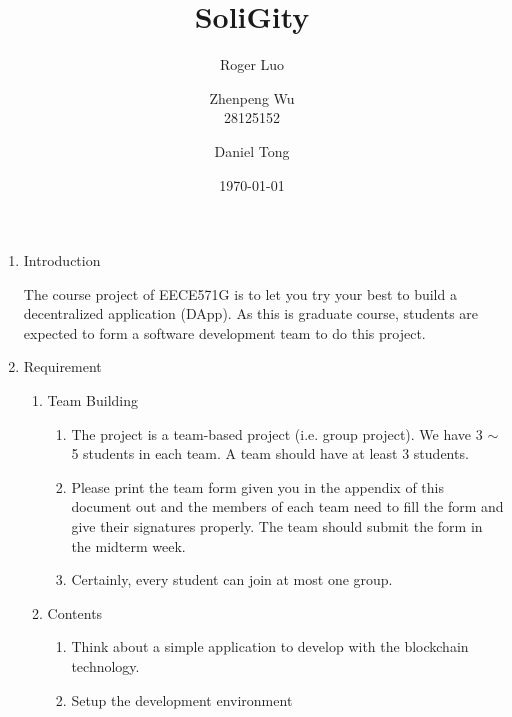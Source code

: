 \documentclass[12pt]{article}
\title{SoliGity}
\author{  Roger Luo
  \and
  Zhenpeng Wu\\
  28125152 
  \and
  Daniel Tong
}
\date{\today}
\renewcommand{\_}{\kern-1.5pt\textunderscore\kern-1.5pt}
\begin{document}
\maketitle



\vspace{\baselineskip}
\begin{enumerate}
	\item Introduction\par

The course project of EECE571G is to let you try your best to build a decentralized application (DApp). As this is graduate course, students are expected to form a software development team to do this project. \par

	\item Requirement\par

\begin{enumerate}
	\item Team Building\par

\begin{enumerate}
	\item The project is a team-based project (i.e. group project). We have 3 $ \sim $  5 students in each team. A team should have at least 3 students. \par

	\item Please print the team form given you in the appendix of this document out and the members of each team need to fill the form and give their signatures properly. The team should submit the form in the midterm week.\par

	\item Certainly, every student can join at most one group. \par


\end{enumerate}
	\item Contents\par

\begin{enumerate}
	\item Think about a simple application to develop with the blockchain technology.\  \par

	\item Setup the development environment \par


\end{enumerate}
\end{enumerate}
\end{enumerate}
\end{document}
